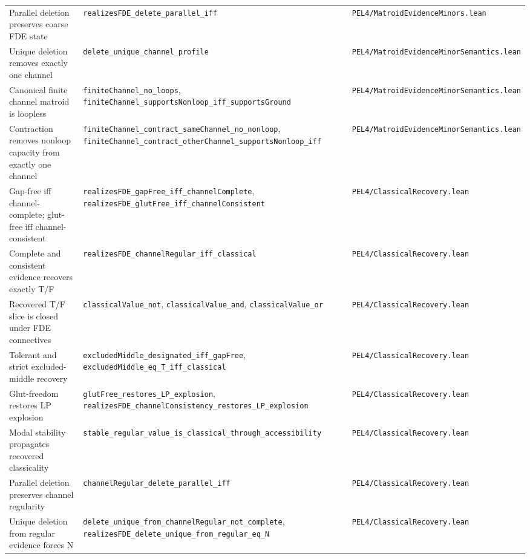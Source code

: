 \begin{longtable}{@{}p{}p{}p{}@{}}
\addlinespace
Parallel deletion preserves coarse FDE state & \texttt{realizesFDE\_delete\_parallel\_iff} & \texttt{PEL4/MatroidEvidenceMinors.lean}\\
\addlinespace
Unique deletion removes exactly one channel & \texttt{delete\_unique\_channel\_profile} & \texttt{PEL4/MatroidEvidenceMinorSemantics.lean}\\
\addlinespace
Canonical finite channel matroid is loopless & \texttt{finiteChannel\_no\_loops}, \texttt{finiteChannel\_supportsNonloop\_iff\_supportsGround} & \texttt{PEL4/MatroidEvidenceMinorSemantics.lean}\\
\addlinespace
Contraction removes nonloop capacity from exactly one channel & \texttt{finiteChannel\_contract\_sameChannel\_no\_nonloop}, \texttt{finiteChannel\_contract\_otherChannel\_supportsNonloop\_iff} & \texttt{PEL4/MatroidEvidenceMinorSemantics.lean}\\
\addlinespace
Gap-free iff channel-complete; glut-free iff channel-consistent & \texttt{realizesFDE\_gapFree\_iff\_channelComplete}, \texttt{realizesFDE\_glutFree\_iff\_channelConsistent} & \texttt{PEL4/ClassicalRecovery.lean}\\
\addlinespace
Complete and consistent evidence recovers exactly T/F & \texttt{realizesFDE\_channelRegular\_iff\_classical} & \texttt{PEL4/ClassicalRecovery.lean}\\
\addlinespace
Recovered T/F slice is closed under FDE connectives & \texttt{classicalValue\_not}, \texttt{classicalValue\_and}, \texttt{classicalValue\_or} & \texttt{PEL4/ClassicalRecovery.lean}\\
\addlinespace
Tolerant and strict excluded-middle recovery & \texttt{excludedMiddle\_designated\_iff\_gapFree}, \texttt{excludedMiddle\_eq\_T\_iff\_classical} & \texttt{PEL4/ClassicalRecovery.lean}\\
\addlinespace
Glut-freedom restores LP explosion & \texttt{glutFree\_restores\_LP\_explosion}, \texttt{realizesFDE\_channelConsistency\_restores\_LP\_explosion} & \texttt{PEL4/ClassicalRecovery.lean}\\
\addlinespace
Modal stability propagates recovered classicality & \texttt{stable\_regular\_value\_is\_classical\_through\_accessibility} & \texttt{PEL4/ClassicalRecovery.lean}\\
\addlinespace
Parallel deletion preserves channel regularity & \texttt{channelRegular\_delete\_parallel\_iff} & \texttt{PEL4/ClassicalRecovery.lean}\\
\addlinespace
Unique deletion from regular evidence forces N & \texttt{delete\_unique\_from\_channelRegular\_not\_complete}, \texttt{realizesFDE\_delete\_unique\_from\_regular\_eq\_N} & \texttt{PEL4/ClassicalRecovery.lean}\\

\end{longtable}

